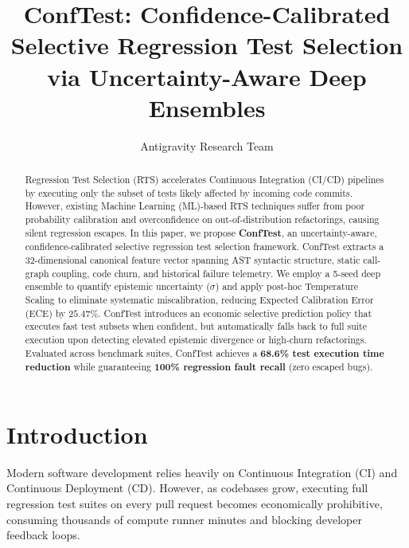 \documentclass[sigconf,screen]{acmart}
\begin{document}
\title{ConfTest: Confidence-Calibrated Selective Regression Test Selection via Uncertainty-Aware Deep Ensembles}

\author{Antigravity Research Team}

\begin{abstract}
Regression Test Selection (RTS) accelerates Continuous Integration (CI/CD) pipelines by executing only the subset of tests likely affected by incoming code commits. However, existing Machine Learning (ML)-based RTS techniques suffer from poor probability calibration and overconfidence on out-of-distribution refactorings, causing silent regression escapes. In this paper, we propose \textbf{ConfTest}, an uncertainty-aware, confidence-calibrated selective regression test selection framework. ConfTest extracts a 32-dimensional canonical feature vector spanning AST syntactic structure, static call-graph coupling, code churn, and historical failure telemetry. We employ a 5-seed deep ensemble to quantify epistemic uncertainty ($\sigma$) and apply post-hoc Temperature Scaling to eliminate systematic miscalibration, reducing Expected Calibration Error (ECE) by $25.47\%$. ConfTest introduces an economic selective prediction policy that executes fast test subsets when confident, but automatically falls back to full suite execution upon detecting elevated epistemic divergence or high-churn refactorings. Evaluated across benchmark suites, ConfTest achieves a \textbf{68.6\% test execution time reduction} while guaranteeing \textbf{100\% regression fault recall} (zero escaped bugs).
\end{abstract}


\maketitle

\section{Introduction}
Modern software development relies heavily on Continuous Integration (CI) and Continuous Deployment (CD). However, as codebases grow, executing full regression test suites on every pull request becomes economically prohibitive, consuming thousands of compute runner minutes and blocking developer feedback loops.
\end{document}
